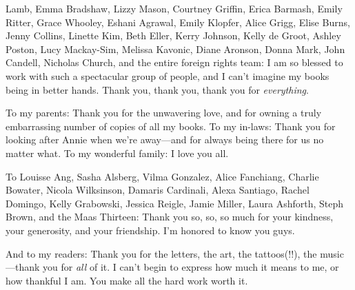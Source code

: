 Lamb, Emma Bradshaw, Lizzy Mason, Courtney Griffin, Erica Barmash, Emily Ritter, Grace Whooley, Eshani Agrawal, Emily Klopfer, Alice Grigg, Elise Burns, Jenny Collins, Linette Kim, Beth Eller, Kerry Johnson, Kelly de Groot, Ashley Poston, Lucy Mackay-Sim, Melissa Kavonic, Diane Aronson, Donna Mark, John Candell, Nicholas Church, and the entire foreign rights team: I am so blessed to work with such a spectacular group of people, and I can't imagine my books being in better hands. Thank you, thank you, thank you for \emph{everything}.

To my parents: Thank you for the unwavering love, and for owning a truly embarrassing number of copies of all my books. To my in-laws: Thank you for looking after Annie when we're away---and for always being there for us no matter what. To my wonderful family: I love you all.

To Louisse Ang, Sasha Alsberg, Vilma Gonzalez, Alice Fanchiang, Charlie Bowater, Nicola Wilksinson, Damaris Cardinali, Alexa Santiago, Rachel Domingo, Kelly Grabowski, Jessica Reigle, Jamie Miller, Laura Ashforth, Steph Brown, and the Maas Thirteen: Thank you so, so, so much for your kindness, your generosity, and your friendship. I'm honored to know you guys.

And to my readers: Thank you for the letters, the art, the tattoos(!!), the music---thank you for \emph{all} of it. I can't begin to express how much it means to me, or how thankful I am. You make all the hard work worth it.
